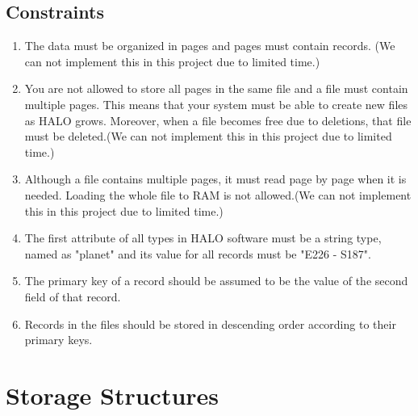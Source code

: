 \documentclass{article}
\begin{document}
\subsection{Constraints}
\begin{enumerate}
    \item The data must be organized in pages and pages must contain records. (We can not implement this in this project due to limited time.)
    \item You are not allowed to store all pages in the same file and a file must contain multiple pages. This means that your system must be able to create new files as HALO grows. Moreover, when a file becomes free due to deletions, that file must be deleted.(We can not implement this in this project due to limited time.)
    \item Although a file contains multiple pages, it must read page by page when it is needed. Loading the whole file to RAM is not allowed.(We can not implement this in this project due to limited time.)
    \item The first attribute of all types in HALO software must be a string type, named as "planet" and its value for all records must be "E226 - S187".
    \item The primary key of a record should be assumed to be the value of the second field of that record.
    \item Records in the files should be stored in descending order according to their primary keys.
\end{enumerate}

\section{Storage Structures}
\label{sec:structures}
\end{document}
